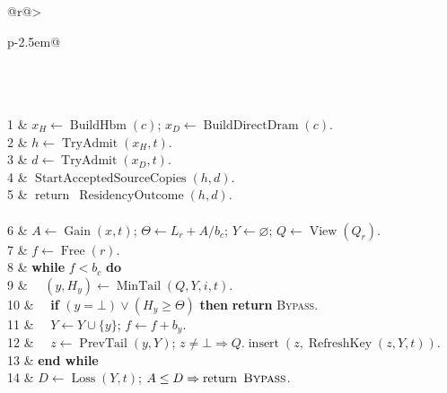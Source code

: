 \begin{algorithm}[t]
\caption{\textsc{SlackLandlord}}
\label{alg:slack-landlord}
\begin{tabular}{@{}r@{\hspace{0.5em}}>{\raggedright\arraybackslash}p{\dimexpr\columnwidth-2.5em\relax}@{}}
\\
\\
\\
1 & $x_H\gets\operatorname{BuildHbm}(c)$; $x_D\gets\operatorname{BuildDirectDram}(c)$.\\
2 & $h\gets\operatorname{TryAdmit}(x_H,t)$.\\
3 & $d\gets\operatorname{TryAdmit}(x_D,t)$.\\
4 & $\operatorname{StartAcceptedSourceCopies}(h,d)$.\\
5 & $\operatorname{return}\ \operatorname{ResidencyOutcome}(h,d)$.\\
\\
6 & $A\gets\operatorname{Gain}(x,t)$; $\Theta\gets L_r+A/b_c$; $Y\gets\varnothing$; $Q\gets\operatorname{View}(Q_r)$.\\
7 & $f\gets\operatorname{Free}(r)$.\\
8 & \textbf{while} $f<b_c$ \textbf{do}\\
9 & $\quad(y,H_y)\gets\operatorname{MinTail}(Q,Y,i,t)$.\\
10 & $\quad$\textbf{if} $(y=\bot)\lor(H_y\ge\Theta)$ \textbf{then} \textbf{return} \textsc{Bypass}.\\
11 & $\quad Y\gets Y\cup\{y\}$; $f\gets f+b_y$.\\
12 & $\quad z\gets\operatorname{PrevTail}(y,Y)$; $z\ne\bot\Rightarrow Q.\operatorname{insert}(z,\operatorname{RefreshKey}(z,Y,t))$.\\
13 & \textbf{end while}\\
14 & $D\gets\operatorname{Loss}(Y,t)$; $A\le D\Rightarrow\operatorname{return}\ \textsc{Bypass}$.\\

\end{tabular}
\end{algorithm}
